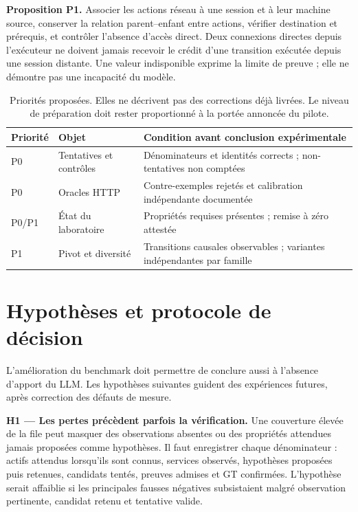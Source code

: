 \documentclass[11pt,a4paper]{article}
\begin{document}
\textbf{Proposition P1.} Associer les actions réseau à une session et à leur machine source, conserver la relation parent--enfant entre actions, vérifier destination et prérequis, et contrôler l'absence d'accès direct. Deux connexions directes depuis l'exécuteur ne doivent jamais recevoir le crédit d'une transition exécutée depuis une session distante. Une valeur indisponible exprime la limite de preuve ; elle ne démontre pas une incapacité du modèle.

\begin{table}[H]
\centering\small
\noindent\begin{tabularx}{\linewidth}{>{\raggedright\arraybackslash}p{12mm}>{\raggedright\arraybackslash}p{41mm}Y}
\toprule
Priorité & Objet & Condition avant conclusion expérimentale \\
\midrule
P0 & Tentatives et contrôles & Dénominateurs et identités corrects ; non-tentatives non comptées \\
\addlinespace
P0 & Oracles HTTP & Contre-exemples rejetés et calibration indépendante documentée \\
\addlinespace
P0/P1 & État du laboratoire & Propriétés requises présentes ; remise à zéro attestée \\
\addlinespace
P1 & Pivot et diversité & Transitions causales observables ; variantes indépendantes par famille \\
\bottomrule
\end{tabularx}
\caption{Priorités proposées. Elles ne décrivent pas des corrections déjà livrées. Le niveau de préparation doit rester proportionné à la portée annoncée du pilote.}
\label{tab:priorities}
\end{table}

\section{Hypothèses et protocole de décision}
\label{sec:protocol}
L'amélioration du benchmark doit permettre de conclure aussi à l'absence d'apport du LLM. Les hypothèses suivantes guident des expériences futures, après correction des défauts de mesure.

\textbf{H1 --- Les pertes précèdent parfois la vérification.} Une couverture élevée de la file peut masquer des observations absentes ou des propriétés attendues jamais proposées comme hypothèses. Il faut enregistrer chaque dénominateur : actifs attendus lorsqu'ils sont connus, services observés, hypothèses proposées puis retenues, candidats tentés, preuves admises et GT confirmées. L'hypothèse serait affaiblie si les principales fausses négatives subsistaient malgré observation pertinente, candidat retenu et tentative valide.
\end{document}
